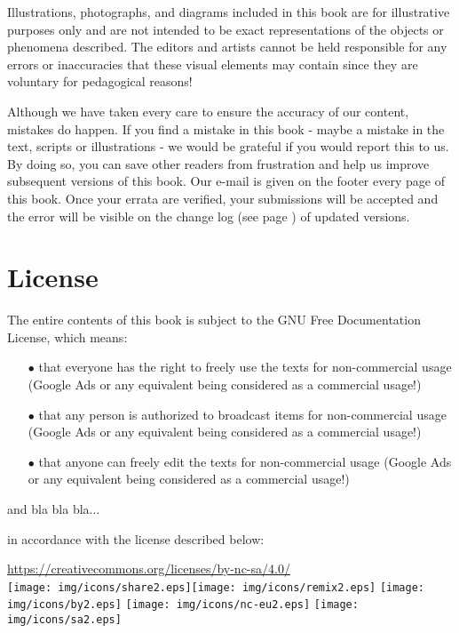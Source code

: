 	Illustrations, photographs, and diagrams included in this book are for illustrative purposes only and are not intended to be exact representations of the objects or phenomena described. The editors and artists cannot be held responsible for any errors or inaccuracies that these visual elements may contain since they are voluntary for pedagogical reasons!
	
	Although we have taken every care to ensure the accuracy of our content, mistakes do happen. If you find a mistake in this book - maybe a mistake in the text, scripts or illustrations - we would be grateful if you would report this to us. By doing so, you can save other readers from frustration and help us improve subsequent versions of this book. Our e-mail is given on the footer every page of this book. Once your errata are verified, your submissions will be accepted and the error will be visible on the change log (see page \pageref{change log}) of updated versions.

	\newpage
	\thispagestyle{empty}
	\mbox{}
	\section{License}
	The entire contents of this book is subject to the GNU Free Documentation License, which means:
	\begin{itemize}
			\item[$\bullet$] that everyone has the right to freely use the texts for non-commercial usage (Google Ads or any equivalent being considered as a commercial usage!)
			\item[$\bullet$] that any person is authorized to broadcast items for non-commercial usage (Google Ads or any equivalent being considered as a commercial usage!)
			\item[$\bullet$] that anyone can freely edit the texts for non-commercial usage (Google Ads or any equivalent being considered as a commercial usage!)
	\end{itemize}
	
	and bla bla bla...

	in accordance with the license described below: 
	
	\begin{center}
	\url{https://creativecommons.org/licenses/by-nc-sa/4.0/}\\[2pt]
\texttt{[image: img/icons/share2.eps]}\texttt{[image: img/icons/remix2.eps]}
\texttt{[image: img/icons/by2.eps]}
\texttt{[image: img/icons/nc-eu2.eps]}
\texttt{[image: img/icons/sa2.eps]}
	\end{center}

